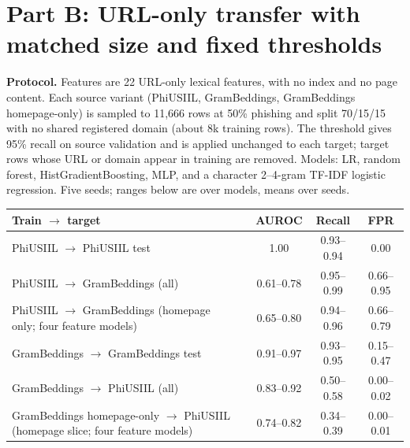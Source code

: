 \documentclass[10pt]{article}
\newcommand{\tsz}{\footnotesize}
\begin{document}
\section{Part B: URL-only transfer with matched size and fixed thresholds}
\textbf{Protocol.} Features are 22 URL-only lexical features, with no index and no page content. Each source variant (PhiUSIIL, GramBeddings, GramBeddings homepage-only) is sampled to 11,666 rows at 50\% phishing and split 70/15/15 with no shared registered domain (about 8k training rows). The threshold gives 95\% recall on source validation and is applied unchanged to each target; target rows whose URL or domain appear in training are removed. Models: LR, random forest, HistGradientBoosting, MLP, and a character 2--4-gram TF-IDF logistic regression. Five seeds; ranges below are over models, means over seeds.
\begin{center}
\tsz
\begin{tabular}{@{}llccc@{}}
\toprule
Train $\to$ target & & AUROC & Recall & FPR \\
\midrule
PhiUSIIL $\to$ PhiUSIIL test & & 1.00 & 0.93--0.94 & 0.00 \\
PhiUSIIL $\to$ GramBeddings (all) & & 0.61--0.78 & 0.95--0.99 & 0.66--0.95 \\
PhiUSIIL $\to$ GramBeddings (homepage only; four feature models) & & 0.65--0.80 & 0.94--0.96 & 0.66--0.79 \\
GramBeddings $\to$ GramBeddings test & & 0.91--0.97 & 0.93--0.95 & 0.15--0.47 \\
GramBeddings $\to$ PhiUSIIL (all) & & 0.83--0.92 & 0.50--0.58 & 0.00--0.02 \\
GramBeddings homepage-only $\to$ PhiUSIIL (homepage slice; four feature models) & & 0.74--0.82 & 0.34--0.39 & 0.00--0.01 \\
\bottomrule
\end{tabular}
\end{center}
\end{document}
